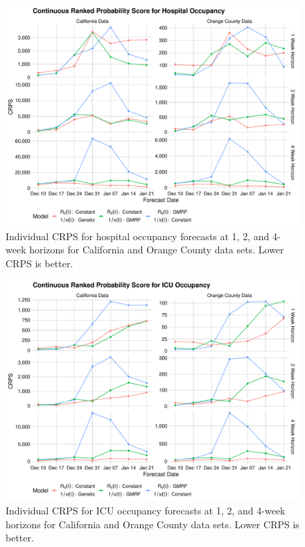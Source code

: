 \begin{figure}
    \centering
    \includegraphics[width=1.0\columnwidth]{real_data_crps_comparison_data_hospitalizations_plot}
    \caption{Individual CRPS for hospital occupancy forecasts at 1, 2, and 4-week horizons for California and Orange County data sets. Lower CRPS is better.}
    \label{ch_5:fig:real_data_crps_comparison_data_hospitalizations_plot}
\end{figure}

\begin{figure}
    \centering
    \includegraphics[width=1.0\columnwidth]{real_data_crps_comparison_data_icu_plot}
    \caption{Individual CRPS for ICU occupancy forecasts at 1, 2, and 4-week horizons for California and Orange County data sets. Lower CRPS is better.}
    \label{ch_5:fig:real_data_crps_comparison_data_icu_plot}
\end{figure}

